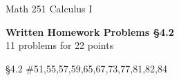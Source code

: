 \documentclass[11pt]{report}
\theoremstyle{plain}
\begin{document}
\hfill Math 251 Calculus I
\begin{center}
\Large{\textbf{Written Homework Problems \S 4.2}} \\
11 problems for 22 points\\
\end{center}

\begin{description}
\item{\S 4.2} \#51,55,57,59,65,67,73,77,81,82,84\\


\end{description}
\end{document}
